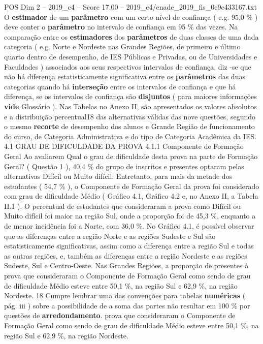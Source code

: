 \begin{textsample}{POS Dim 2 – 2019\_c4 – Score 17.00 – 2019\_c4/enade\_2019\_fis\_0e9c433167.txt}
O \textbf{estimador} de um \textbf{parâmetro} com um certo nível de confiança ( e.g. 95,0 \% ) deve conter o \textbf{parâmetro} no intervalo de confiança em 95 \% das vezes.
Na comparação entre os \textbf{estimadores} dos \textbf{parâmetros} de duas classes de uma dada categoria ( e.g.
Norte e Nordeste nas Grandes Regiões, de primeiro e último quarto dentro de desempenho, de IES Públicas e Privadas, ou de Universidades e Faculdades ) associados aos seus respectivos intervalos de confiança, diz -se que não há diferença estatisticamente significativa entre os \textbf{parâmetros} das duas categorias quando há \textbf{interseção} entre os intervalos de confiança e que há diferença, se os intervalos de confiança são \textbf{disjuntos} ( para maiores informações \textbf{vide} Glossário ).
Nas Tabelas no Anexo II, são apresentados os valores absolutos e a distribuição percentual18 das alternativas válidas das nove questões, segundo o mesmo \textbf{recorte} de desempenho dos alunos e Grande Região de funcionamento do curso, de Categoria Administrativa e do tipo de Categoria Acadêmica da IES. 4.1 GRAU DE DIFICULDADE DA PROVA 4.1.1 Componente de Formação Geral Ao avaliarem Qual o grau de dificuldade desta prova na parte de Formação Geral? ( Questão 1 ), 40,4 \% do grupo de inscritos e presentes optaram pelas alternativas Difícil ou Muito difícil.
Entretanto, para mais da metade dos estudantes ( 54,7 \% ), o Componente de Formação Geral da prova foi considerado com grau de dificuldade Médio ( Gráfico 4.1, Gráfico 4.2 e, no Anexo II, a Tabela II.1 ).
O percentual de estudantes que consideraram a prova como Difícil ou Muito difícil foi maior na região Sul, onde a proporção foi de 45,3 \%, enquanto a de menor incidência foi a Norte, com 36,0 \%.
No Gráfico 4.1, é possível observar que as diferenças entre a região Norte e as regiões Sudeste e Sul são estatisticamente significativas, assim como a diferença entre a região Sul e todas as outras regiões, e, também as diferenças entre a região Nordeste e as regiões Sudeste, Sul e Centro-Oeste.
Nas Grandes Regiões, a proporção de presentes à prova que consideraram o Componente de Formação Geral como sendo de grau de dificuldade Médio esteve entre 50,1 \%, na região Sul e 62,9 \%, na região Nordeste. 18 Cumpre lembrar uma das convenções para tabelas \textbf{numéricas} ( pág. iii ) sobre a possibilidade de a soma das partes não resultar em 100 \% por questões de \textbf{arredondamento}. prova que consideraram o Componente de Formação Geral como sendo de grau de dificuldade Médio esteve entre 50,1 \%, na região Sul e 62,9 \%, na região Nordeste.

\end{textsample}
